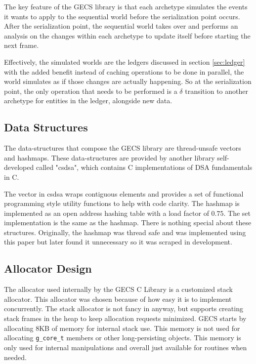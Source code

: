 The key feature of the GECS library is that each archetype simulates the events it wants to apply to the sequential world before the serialization point occurs. After the serialization point, the sequential world takes over and performs an analysis on the changes within each archetype to update itself before starting the next frame.

Effectively, the simulated worlds are the ledgers discussed in section \ref{sec:ledger} with the added benefit instead of caching operations to be done in parallel, the world simulates as if those changes are actually happening. So at the serialization point, the only operation that needs to be performed is a $\delta$ transition to another archetype for entities in the ledger, alongside new data.

\subsection{Data Structures}
\label{sec:ds}
The data-structures that compose the GECS library are thread-unsafe vectors and hashmaps. These data-structures are provided by another library self-developed called "csdsa", which contains C implementations of DSA fundamentals in C. 

The vector in csdsa wraps contiguous elements and provides a set of functional programming style utility functions to help with code clarity. The hashmap is implemented as an open address hashing table with a load factor of $0.75$. The set implementation is the same as the hashmap. There is nothing special about these structures. Originally, the hashmap was thread safe and was implemented using this paper \cite{hashmaps} but later found it unnecessary so it was scraped in development. 

\subsection{Allocator Design}
The allocator used internally by the GECS C Library is a customized stack allocator. This allocator was chosen because of how easy it is to implement concurrently. The stack allocator is not fancy in anyway, but supports creating stack frames in the heap to keep allocation requests minimized. GECS starts by allocating 8KB of memory for internal stack use. This memory is not used for allocating \texttt{g\_core\_t} members or other long-persisting objects. This memory is only used for internal manipulations and overall just available for routines when needed.

